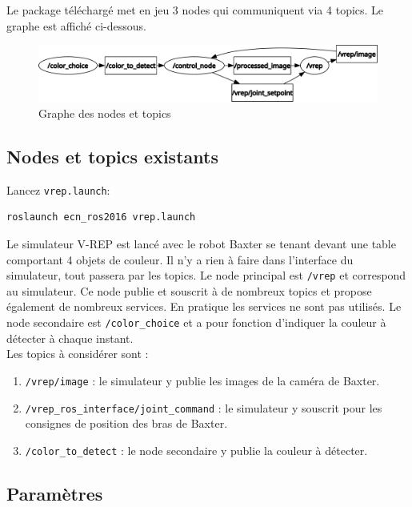 \documentclass{ecnreport}
\begin{document}
Le package téléchargé met en jeu 3 nodes qui communiquent via 4 topics. Le graphe est affiché ci-dessous.

\begin{figure}[h!]
 \includegraphics[width=\linewidth]{rosgraph}
 \caption{Graphe des nodes et topics}
\end{figure}


\subsection{Nodes et topics existants}

Lancez \texttt{vrep.launch}:
\begin{center}
\begin{lstlisting}
roslaunch ecn_ros2016 vrep.launch
\end{lstlisting}
\end{center}

Le simulateur V-REP est lancé avec le robot Baxter se tenant devant une table comportant 4 objets de couleur. Il n'y a rien à faire dans l'interface du simulateur, 
tout passera par les topics. 
Le node principal est \texttt{/vrep} et correspond au simulateur. Ce node publie et souscrit à de nombreux topics et propose également de nombreux services. 
En pratique les services ne sont pas utilisés. 
Le node secondaire est \texttt{/color\_choice} et a pour fonction d'indiquer la couleur à détecter à chaque instant.\\
Les topics à considérer sont :
\begin{enumerate}
 \item \texttt{/vrep/image} : le simulateur y publie les images de la caméra de Baxter.
 \item \texttt{/vrep\_ros\_interface/joint\_command} : le simulateur y souscrit pour les consignes de position des bras de Baxter.
\item \texttt{/color\_to\_detect} : le node secondaire y publie la couleur à détecter.
 \end{enumerate}

\subsection{Paramètres}
\end{document}
